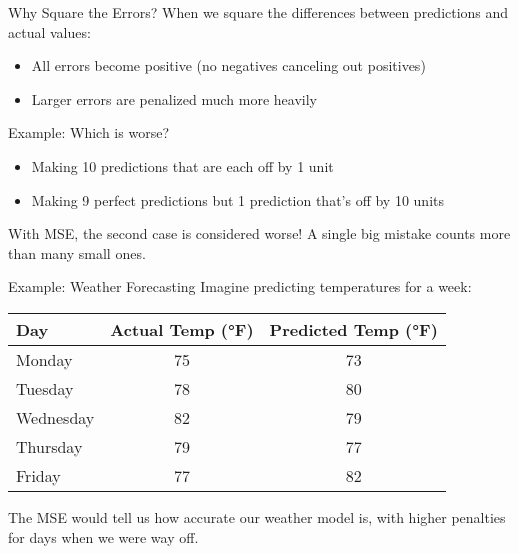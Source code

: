 \documentclass{beamer}
\begin{document}
\begin{frame}{Why Square the Errors?}
  When we square the differences between predictions and actual values:
  
  \begin{itemize}
    \item All errors become positive (no negatives canceling out positives)
    \item Larger errors are penalized much more heavily
  \end{itemize}
  
  \vspace{0.5cm}
  Example: Which is worse?
  \begin{itemize}
    \item Making 10 predictions that are each off by 1 unit
    \item Making 9 perfect predictions but 1 prediction that's off by 10 units
  \end{itemize}
  
  With MSE, the second case is considered worse! A single big mistake counts more than many small ones.
\end{frame}

\begin{frame}{Example: Weather Forecasting}
  Imagine predicting temperatures for a week:
  
  \begin{tabular}{lcc}
    \hline
    Day & Actual Temp (°F) & Predicted Temp (°F) \\
    \hline
    Monday & 75 & 73 \\
    Tuesday & 78 & 80 \\
    Wednesday & 82 & 79 \\
    Thursday & 79 & 77 \\
    Friday & 77 & 82 \\
    \hline
  \end{tabular}
  
  \vspace{0.5cm}
  The MSE would tell us how accurate our weather model is, with higher penalties for days when we were way off.
\end{frame}
\end{document}
